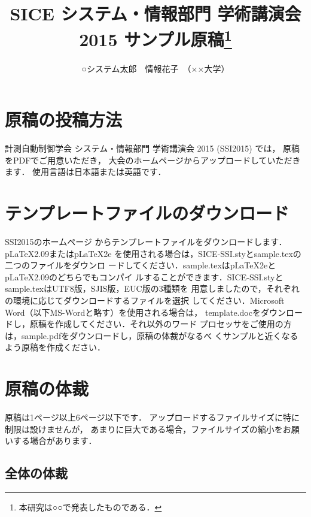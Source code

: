 \documentclass{jarticle}
\begin{document}
\title{SICE システム・情報部門 学術講演会 2015 サンプル原稿\thanks
{本研究は○○で発表したものである．}}
\author{○システム太郎\ \ 情報花子\ （××大学）}



\maketitle\thispagestyle{empty}
\pagestyle{empty}

\section{原稿の投稿方法}

計測自動制御学会 システム・情報部門 学術講演会 2015 (SSI2015) では，
原稿をPDFでご用意いただき，
大会のホームページ\cite{大会ホームページ}からアップロードしていただきます．
使用言語は日本語または英語です．

\section{テンプレートファイルのダウンロード}

SSI2015のホームページ\cite{大会ホームページ}
からテンプレートファイルをダウンロードします．pLaTeX2.09またはpLaTeX2e
を使用される場合は，SICE-SSI.styとsample.texの二つのファイルをダウンロ
ードしてください．sample.texはpLaTeX2eとpLaTeX2.09のどちらでもコンパイ
ルすることができます．SICE-SSI.styとsample.texはUTF8版，SJIS版，EUC版の3種類を
用意しましたので，それぞれの環境に応じてダウンロードするファイルを選択
してください．Microsoft Word（以下MS-Wordと略す）を使用される場合は，
template.docをダウンロードし，原稿を作成してください．それ以外のワード
プロセッサをご使用の方は，sample.pdfをダウンロードし，原稿の体裁がなるべ
くサンプルと近くなるよう原稿を作成ください．

\section{原稿の体裁}

原稿は1ページ以上6ページ以下です．
アップロードするファイルサイズに特に制限は設けませんが，
あまりに巨大である場合，ファイルサイズの縮小をお願いする場合があります．

\subsection{全体の体裁}
\end{document}
